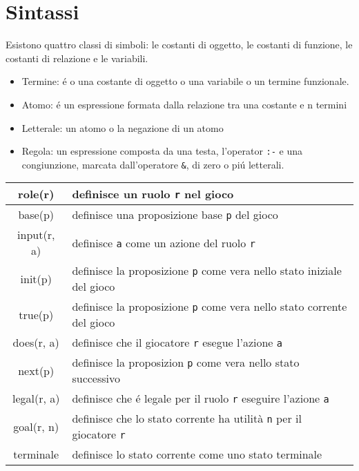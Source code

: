 \section{Sintassi}
Esistono quattro classi di simboli: le costanti di oggetto, 
le costanti di funzione, le costanti di relazione e le variabili. \\
\begin{itemize}
    \item Termine: é o una costante di oggetto o una variabile o un termine funzionale.
    \item Atomo: é un espressione formata dalla relazione tra una costante e n termini
    \item Letterale: un atomo o la negazione di un atomo
    \item {
        Regola: un espressione composta da una testa, l'operator \lstinline|:-| e una congiunzione, 
        marcata dall'operatore \lstinline|&|, di zero o piú letterali.
    }
\end{itemize}
\begin{center}
\begin{tabular}{|c|p{5cm}|}
    \hline
    role(r) & definisce un ruolo \lstinline|r| nel gioco \\
    \hline
    base(p) & definisce una proposizione base \lstinline|p| del gioco \\
    \hline
    input(r, a) & definisce \lstinline|a| come un azione del ruolo \lstinline|r| \\
    \hline
    init(p) & definisce la proposizione \lstinline|p| come vera nello stato iniziale del gioco \\ 
    \hline
    true(p) & definisce la proposizione \lstinline|p| come vera nello stato corrente del gioco \\
    \hline
    does(r, a) & definisce che il giocatore \lstinline|r| esegue l'azione \lstinline|a| \\
    \hline
    next(p) & definisce la proposizion \lstinline|p| come vera nello stato successivo \\
    \hline
    legal(r, a) & definisce che é legale per il ruolo \lstinline|r| eseguire l'azione \lstinline|a| \\
    \hline
    goal(r, n) & definisce che lo stato corrente ha utilità \lstinline|n| per il giocatore \lstinline|r| \\
    \hline
    terminale & definisce lo stato corrente come uno stato terminale \\ 
    \hline
\end{tabular}
\end{center}
